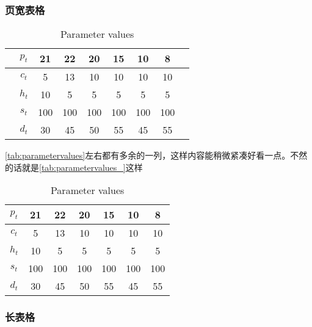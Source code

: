 \subsubsection{页宽表格}
\begin{table}[!ht]
    \caption{Parameter values}\label{tab:parametervalues}
    \begin{tabular*}{\hsize}{@{}@{\extracolsep{\fill}}ccccccccc@{}}
        \toprule
        &$p_{t}$  &21  &22  &20  &15  &10  &8   &  \\
        \midrule
        &$c_{t}$  &5   &13  &10  &10  &10  &10  &  \\
        &$h_{t}$  &10  &5   &5   &5   &5   &5   &  \\
        &$s_{t}$  &100 &100 &100 &100 &100 &100 &  \\
        &$d_{t}$  &30  &45  &50  &55  &45  &55  &  \\
        \bottomrule
    \end{tabular*}
\end{table}

\autoref{tab:parametervalues}左右都有多余的一列，这样内容能稍微紧凑好看一点。不然的话就是\autoref{tab:parametervalues_}这样

\begin{table}[!ht]
    \caption{Parameter values}\label{tab:parametervalues_}
    \begin{tabular*}{\hsize}{@{}@{\extracolsep{\fill}}ccccccc@{}}
        \toprule
        $p_{t}$  &21  &22  &20  &15  &10  &8     \\
        \midrule
        $c_{t}$  &5   &13  &10  &10  &10  &10    \\
        $h_{t}$  &10  &5   &5   &5   &5   &5     \\
        $s_{t}$  &100 &100 &100 &100 &100 &100   \\
        $d_{t}$  &30  &45  &50  &55  &45  &55    \\
        \bottomrule
    \end{tabular*}
\end{table}

\subsubsection{长表格}

